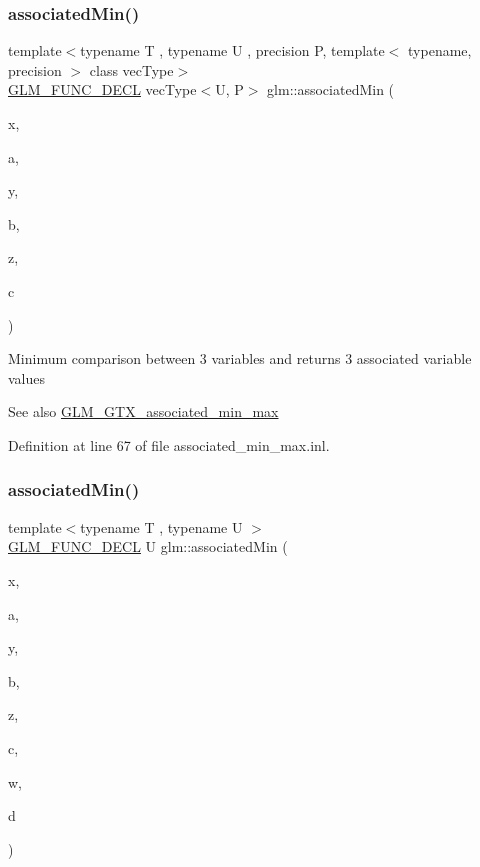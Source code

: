 \subsubsection{\texorpdfstring{associatedMin()}{associatedMin()}\hspace{0.1cm}{\footnotesize\ttfamily [6/10]}}
{\footnotesize\ttfamily template$<$typename T , typename U , precision P, template$<$ typename, precision $>$ class vec\+Type$>$ \\
\mbox{\hyperlink{setup_8hpp_ab2d052de21a70539923e9bcbf6e83a51}{G\+L\+M\+\_\+\+F\+U\+N\+C\+\_\+\+D\+E\+CL}} vec\+Type$<$U, P$>$ glm\+::associated\+Min (\begin{DoxyParamCaption}\item[{vec\+Type$<$ T, P $>$ const \&}]{x,  }\item[{vec\+Type$<$ U, P $>$ const \&}]{a,  }\item[{vec\+Type$<$ T, P $>$ const \&}]{y,  }\item[{vec\+Type$<$ U, P $>$ const \&}]{b,  }\item[{vec\+Type$<$ T, P $>$ const \&}]{z,  }\item[{vec\+Type$<$ U, P $>$ const \&}]{c }\end{DoxyParamCaption})}

Minimum comparison between 3 variables and returns 3 associated variable values \begin{DoxySeeAlso}{See also}
\mbox{\hyperlink{group__gtx__associated__min__max}{G\+L\+M\+\_\+\+G\+T\+X\+\_\+associated\+\_\+min\+\_\+max}} 
\end{DoxySeeAlso}


Definition at line 67 of file associated\+\_\+min\+\_\+max.\+inl.

\mbox{\label{group__gtx__associated__min__max_ga432224ebe2085eaa2b63a077ecbbbff6}} 
\subsubsection{\texorpdfstring{associatedMin()}{associatedMin()}\hspace{0.1cm}{\footnotesize\ttfamily [7/10]}}
{\footnotesize\ttfamily template$<$typename T , typename U $>$ \\
\mbox{\hyperlink{setup_8hpp_ab2d052de21a70539923e9bcbf6e83a51}{G\+L\+M\+\_\+\+F\+U\+N\+C\+\_\+\+D\+E\+CL}} U glm\+::associated\+Min (\begin{DoxyParamCaption}\item[{T}]{x,  }\item[{U}]{a,  }\item[{T}]{y,  }\item[{U}]{b,  }\item[{T}]{z,  }\item[{U}]{c,  }\item[{T}]{w,  }\item[{U}]{d }\end{DoxyParamCaption})}

